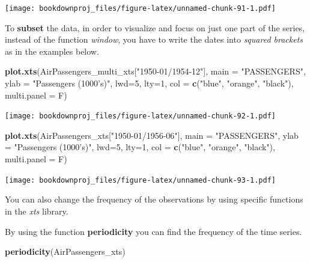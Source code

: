 \documentclass[
]{article}
\newenvironment{Shaded}{\begin{snugshade}}{\end{snugshade}}
\newcommand{\DataTypeTok}[1]{\textcolor[rgb]{0.13,0.29,0.53}{#1}}
\newcommand{\DecValTok}[1]{\textcolor[rgb]{0.00,0.00,0.81}{#1}}
\newcommand{\KeywordTok}[1]{\textcolor[rgb]{0.13,0.29,0.53}{\textbf{#1}}}
\newcommand{\NormalTok}[1]{#1}
\newcommand{\StringTok}[1]{\textcolor[rgb]{0.31,0.60,0.02}{#1}}
\begin{document}
\texttt{[image: bookdownproj\_files/figure-latex/unnamed-chunk-91-1.pdf]}

To \textbf{subset} the data, in order to visualize and focus on just one part of the series, instead of the function \emph{window}, you have to write the dates into \emph{squared brackets} as in the examples below.

\begin{Shaded}
\begin{Highlighting}[]
\KeywordTok{plot.xts}\NormalTok{(AirPassengers_multi_xts[}\StringTok{"1950-01/1954-12"}\NormalTok{], }
         \DataTypeTok{main =} \StringTok{"PASSENGERS"}\NormalTok{,}
         \DataTypeTok{ylab =} \StringTok{"Passengers (1000's)"}\NormalTok{, }
         \DataTypeTok{lwd=}\DecValTok{5}\NormalTok{, }\DataTypeTok{lty=}\DecValTok{1}\NormalTok{,}
         \DataTypeTok{col =} \KeywordTok{c}\NormalTok{(}\StringTok{"blue"}\NormalTok{, }\StringTok{"orange"}\NormalTok{, }\StringTok{"black"}\NormalTok{),}
         \DataTypeTok{multi.panel =}\NormalTok{ F)}
\end{Highlighting}
\end{Shaded}

\texttt{[image: bookdownproj\_files/figure-latex/unnamed-chunk-92-1.pdf]}

\begin{Shaded}
\begin{Highlighting}[]
\KeywordTok{plot.xts}\NormalTok{(AirPassengers_xts[}\StringTok{"1950-01/1956-06"}\NormalTok{], }
         \DataTypeTok{main =} \StringTok{"PASSENGERS"}\NormalTok{,}
         \DataTypeTok{ylab =} \StringTok{"Passengers (1000's)"}\NormalTok{, }
         \DataTypeTok{lwd=}\DecValTok{5}\NormalTok{, }\DataTypeTok{lty=}\DecValTok{1}\NormalTok{,}
         \DataTypeTok{col =} \KeywordTok{c}\NormalTok{(}\StringTok{"blue"}\NormalTok{, }\StringTok{"orange"}\NormalTok{, }\StringTok{"black"}\NormalTok{),}
         \DataTypeTok{multi.panel =}\NormalTok{ F)}
\end{Highlighting}
\end{Shaded}

\texttt{[image: bookdownproj\_files/figure-latex/unnamed-chunk-93-1.pdf]}

You can also change the frequency of the observations by using specific functions in the \emph{xts} library.

By using the function \textbf{periodicity} you can find the frequency of the time series.

\begin{Shaded}
\begin{Highlighting}[]
\KeywordTok{periodicity}\NormalTok{(AirPassengers_xts)}
\end{Highlighting}
\end{Shaded}
\end{document}
